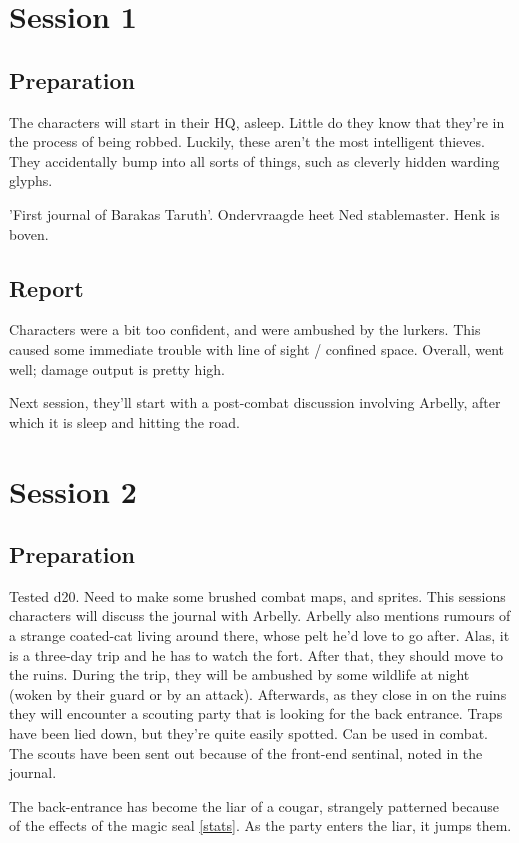 \chapter{Session 1}
\section{Preparation}
The characters will start in their HQ, asleep. Little do they know that they're in the process of being robbed. Luckily, these aren't the most intelligent thieves. They accidentally bump into all sorts of things, such as cleverly hidden warding glyphs.

'First journal of Barakas Taruth'. Ondervraagde heet Ned stablemaster. Henk is boven.

\section{Report}
Characters were a bit too confident, and were ambushed by the lurkers. This caused some immediate trouble with line of sight / confined space. Overall, went well; damage output is pretty high.

Next session, they'll start with a post-combat discussion involving Arbelly, after which it is sleep and hitting the road.

\chapter{Session 2}
\section{Preparation}
Tested d20. Need to make some brushed combat maps, and sprites. This sessions characters will discuss the journal with Arbelly. Arbelly also mentions rumours of a strange coated-cat living around there, whose pelt he'd love to go after. Alas, it is a three-day trip and he has to watch the fort. After that, they should move to the ruins. During the trip, they will be ambushed by some wildlife at night (woken by their guard or by an attack). Afterwards, as they close in on the ruins they will encounter a scouting party that is looking for the back entrance. Traps have been lied down, but they're quite easily spotted. Can be used in combat. The scouts have been sent out because of the front-end sentinal, noted in the journal.

The back-entrance has become the liar of a cougar, strangely patterned because of the effects of the magic seal \href{http://www.dandwiki.com/wiki/Wild_Cats_(4e_Creature)}{[stats]}. As the party enters the liar, it jumps them.

